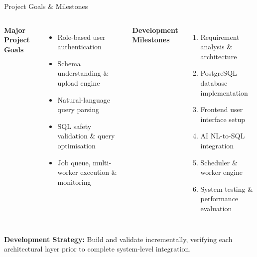 \documentclass[aspectratio=169,11pt]{beamer}
\begin{document}
\begin{frame}{Project Goals \& Milestones}

\begin{columns}[T,totalwidth=\textwidth]


\textbf{\color{GEUBlue}\small Major Project Goals}
\begin{itemize}\itemsep1.5pt
\item[\tiny$\bullet$] \scriptsize Role-based user authentication
\item[\tiny$\bullet$] \scriptsize Schema understanding \& upload engine
\item[\tiny$\bullet$] \scriptsize Natural-language query parsing
\item[\tiny$\bullet$] \scriptsize SQL safety validation \& query optimisation
\item[\tiny$\bullet$] \scriptsize Job queue, multi-worker execution \& monitoring
\end{itemize}


\textbf{\color{GEUBlue}\small Development Milestones}
\begin{enumerate}\itemsep1.5pt
\scriptsize
\item Requirement analysis \& architecture
\item PostgreSQL database implementation
\item Frontend user interface setup
\item AI NL-to-SQL integration
\item Scheduler \& worker engine
\item System testing \& performance evaluation
\end{enumerate}

\end{columns}

\vspace{4mm}

\begin{center}
\colorbox{GEULightBlue}{
\parbox{.88\textwidth}{
\centering\scriptsize
\textbf{Development Strategy:} Build and validate incrementally, verifying each architectural layer prior to complete system-level integration.
}}
\end{center}

\end{frame}


\end{document}
